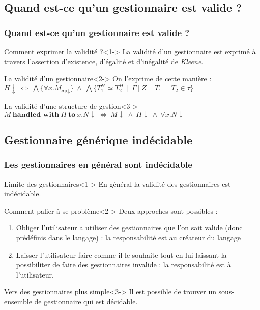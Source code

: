 \documentclass{beamer}
\begin{document}
\subsection{Quand est-ce qu'un gestionnaire est valide ?}
\begin{frame}
	\frametitle{Quand est-ce qu'un gestionnaire est valide ?}
	
	\begin{block}{Comment exprimer la validité ?}<1->
		La validité d'un gestionnaire est exprimé à travers l'assertion d'existence, d'égalité et d'inégalité de \textit{Kleene}.
	\end{block}

	\begin{block}{La validité d'un gestionnaire}<2->
		On l'exprime de cette manière :
		\\
		$H\downarrow~\Leftrightarrow~\bigwedge\{\forall x.M_{\textbf{op}\downarrow}\}~\land~\bigwedge\{T_1^H \simeq T_2^H~~|~~\Gamma~|~Z \vdash T_1 = T_2 \in \tau\}$
	\end{block}
		
	\begin{block}{La validité d'une structure de gestion}<3->
		$M~\textbf{handled~with}~H~\textbf{to}~x.N\downarrow~\Leftrightarrow~ M\downarrow~\land~H\downarrow~\land~\forall x.N\downarrow$
	\end{block}
	
\end{frame}

\subsection{Gestionnaire générique indécidable}
\begin{frame}
	\frametitle{Les gestionnaires en général sont indécidable}
	\begin{block}{Limite des gestionnaires}<1->
		En général la validité des gestionnaires est \alert{indécidable}.
	\end{block}

	\begin{block}{Comment palier à se problème}<2->
		Deux approches sont possibles : 
		\begin{enumerate}
			\item Obliger l'utilisateur a utiliser des gestionnaires que l'on sait valide (donc prédéfinis dans le langage) : \alert{la responsabilité est au créateur du langage}
			\item Laisser l'utilisateur faire comme il le souhaite tout en lui laissant la possibiliter de faire des gestionnaires
			invalide : \alert{la responsabilité est à l'utilisateur}.
		\end{enumerate}
	\end{block}

	\begin{block}{Vers des gestionnaires plus simple}<3->
		Il est possible de trouver un sous-ensemble de gestionnaire qui est \alert{décidable}.
	\end{block}
\end{frame}
\end{document}
